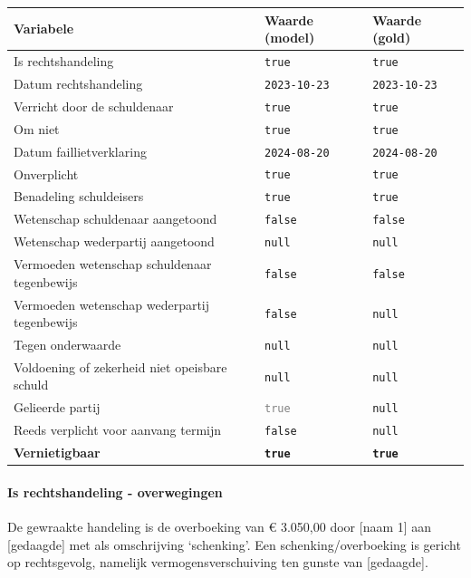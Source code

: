 \documentclass[
  dutch,
  a4paper,
]{article}
\begin{document}
\begin{center}
\small
\begin{tabular}{@{}p{7.4cm}p{2.6cm}p{2.6cm}@{}}
\toprule
Variabele & Waarde (model) & Waarde (gold) \\
\midrule
Is rechtshandeling & \texttt{true} & \texttt{true} \\
Datum rechtshandeling & \texttt{2023-10-23} & \texttt{2023-10-23} \\
Verricht door de schuldenaar & \texttt{true} & \texttt{true} \\
Om niet & \texttt{true} & \texttt{true} \\
Datum faillietverklaring & \texttt{2024-08-20} & \texttt{2024-08-20} \\
Onverplicht & \texttt{true} & \texttt{true} \\
Benadeling schuldeisers & \texttt{true} & \texttt{true} \\
Wetenschap schuldenaar aangetoond & \texttt{false} & \texttt{false} \\
Wetenschap wederpartij aangetoond & \texttt{null} & \texttt{null} \\
Vermoeden wetenschap schuldenaar tegenbewijs & \texttt{false} & \texttt{false} \\
Vermoeden wetenschap wederpartij tegenbewijs & \texttt{false} & \texttt{null} \\
Tegen onderwaarde & \texttt{null} & \texttt{null} \\
Voldoening of zekerheid niet opeisbare schuld & \texttt{null} & \texttt{null} \\
Gelieerde partij & \textcolor{gray}{\texttt{true}} & \texttt{null} \\
Reeds verplicht voor aanvang termijn & \texttt{false} & \texttt{null} \\
\textbf{Vernietigbaar} & \textbf{\texttt{true}} & \textbf{\texttt{true}} \\
\bottomrule
\end{tabular}
\end{center}

\paragraph{Is rechtshandeling - overwegingen}\label{is-rechtshandeling---overwegingen-34}

De gewraakte handeling is de overboeking van € 3.050,00 door {[}naam 1{]} aan {[}gedaagde{]} met als omschrijving `schenking'. Een schenking/overboeking is gericht op rechtsgevolg, namelijk vermogensverschuiving ten gunste van {[}gedaagde{]}.
\end{document}
